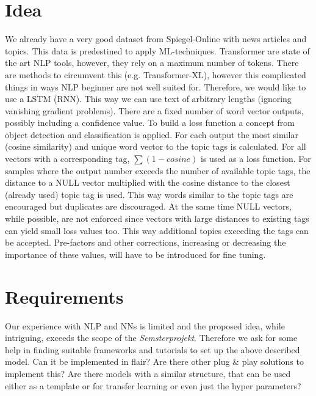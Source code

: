 \documentclass[a4paper,10pt]{article}
\begin{document}
\section{Idea}
We already have a very good dataset from Spiegel-Online with news articles and topics. This data is predestined to apply ML-techniques. Transformer are state of the art NLP tools, however, they rely on a maximum number of tokens. There are methods to circumvent this (e.g. Transformer-XL), however this complicated things in ways NLP beginner are not well suited for. Therefore, we would like to use a LSTM (RNN). This way we can use text of arbitrary lengths (ignoring vanishing gradient problems). There are a fixed number of word vector outputs, possibly including a confidence value. To build a loss function a concept from object detection and classification is applied. For each output the most similar (cosine similarity) and unique word vector to the topic tags is calculated. For all vectors with a corresponding tag, $\sum (1-cosine)$ is used as a loss function. For samples where the output number exceeds the number of available topic tags, the distance to a NULL vector multiplied with the cosine distance to the closest (already used) topic tag is used. This way words similar to the topic tags are encouraged but duplicates are discouraged. At the same time NULL vectors, while possible, are not enforced since vectors with large distances to existing tags can yield small loss values too. This way additional topics exceeding the tags can be accepted. Pre-factors and other corrections, increasing or decreasing the importance of these values, will have to be introduced for fine tuning.

\section{Requirements}
Our experience with NLP and NNs is limited and the proposed idea, while intriguing, exceeds the scope of the \textit{Semsterprojekt}. Therefore we ask for some help in finding suitable frameworks and tutorials to set up the above described model. Can it be implemented in flair? Are there other plug \& play solutions to implement this? Are there models with a similar structure, that can be used either as a template or for transfer learning or even just the hyper parameters?   
\end{document}
